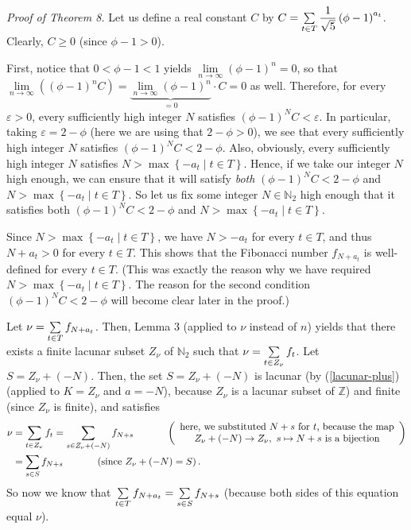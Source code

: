 \documentclass[numbers=enddot,12pt,final,onecolumn,notitlepage]{scrartcl}%
\numberwithin{exer}{section}
\theoremstyle{definition}
\let\sumnonlimits\sum
\renewcommand{\sum}{\sumnonlimits\limits}
\begin{document}
\textit{Proof of Theorem 8.} Let us define a real constant $C$ by
$C=\sum\limits_{t\in T}\dfrac{1}{\sqrt{5}}\left(  \phi-1\right)  ^{a_{t}}$.
Clearly, $C\geq0$ (since $\phi-1>0$).

First, notice that $0<\phi-1<1$ yields $\lim\limits_{n\rightarrow\infty
}\left(  \phi-1\right)  ^{n}=0$, so that $\lim\limits_{n\rightarrow\infty
}\left(  \left(  \phi-1\right)  ^{n}C\right)  =\underbrace{\lim
\limits_{n\rightarrow\infty}\left(  \phi-1\right)  ^{n}}_{=0}\cdot C=0$ as
well. Therefore, for every $\varepsilon>0$, every sufficiently high integer
$N$ satisfies $\left(  \phi-1\right)  ^{N}C<\varepsilon$. In particular,
taking $\varepsilon=2-\phi$ (here we are using that $2-\phi>0$), we see that
every sufficiently high integer $N$ satisfies $\left(  \phi-1\right)
^{N}C<2-\phi$. Also, obviously, every sufficiently high integer $N$ satisfies
$N>\max\left\{  -a_{t}\mid t\in T\right\}  $. Hence, if we take our integer
$N$ high enough, we can ensure that it will satisfy \textit{both} $\left(
\phi-1\right)  ^{N}C<2-\phi$ and $N>\max\left\{  -a_{t}\mid t\in T\right\}  $.
So let us fix some integer $N\in\mathbb{N}_{2}$ high enough that it satisfies
both $\left(  \phi-1\right)  ^{N}C<2-\phi$ and $N>\max\left\{  -a_{t}\mid t\in
T\right\}  $.

Since $N>\max\left\{  -a_{t}\mid t\in T\right\}  $, we have $N>-a_{t}$ for
every $t\in T$, and thus $N+a_{t}>0$ for every $t\in T$. This shows that the
Fibonacci number $f_{N+a_{t}}$ is well-defined for every $t\in T$. (This was
exactly the reason why we have required $N>\max\left\{  -a_{t}\mid t\in
T\right\}  $. The reason for the second condition $\left(  \phi-1\right)
^{N}C<2-\phi$ will become clear later in the proof.)

Let $\nu=\sum\limits_{t\in T}f_{N+a_{t}}$. Then, Lemma 3 (applied to $\nu$
instead of $n$) yields that there exists a finite lacunar subset $Z_{\nu}$ of
$\mathbb{N}_{2}$ such that $\nu=\sum\limits_{t\in Z_{\nu}}f_{t}$. Let
$S=Z_{\nu}+\left(  -N\right)  $. Then, the set $S=Z_{\nu}+\left(  -N\right)  $
is lacunar (by (\ref{lacunar-plus}) (applied to $K=Z_{\nu}$ and $a=-N$),
because $Z_{\nu}$ is a lacunar subset of $\mathbb{Z}$) and finite (since
$Z_{\nu}$ is finite), and satisfies%
\begin{align*}
\nu &  =\sum\limits_{t\in Z_{\nu}}f_{t}=\sum\limits_{s\in Z_{\nu}+\left(
-N\right)  }f_{N+s}\ \ \ \ \ \ \ \ \ \ \left(
\begin{array}
[c]{c}%
\text{here, we substituted }N+s\text{ for }t\text{, because the map}\\
Z_{\nu}+\left(  -N\right)  \rightarrow Z_{\nu},\text{ }s\mapsto N+s\text{ is a
bijection}%
\end{array}
\right) \\
&  =\sum\limits_{s\in S}f_{N+s}\ \ \ \ \ \ \ \ \ \ \left(  \text{since }%
Z_{\nu}+\left(  -N\right)  =S\right)  .
\end{align*}
So now we know that $\sum\limits_{t\in T}f_{N+a_{t}}=\sum\limits_{s\in
S}f_{N+s}$ (because both sides of this equation equal $\nu$).
\end{document}
